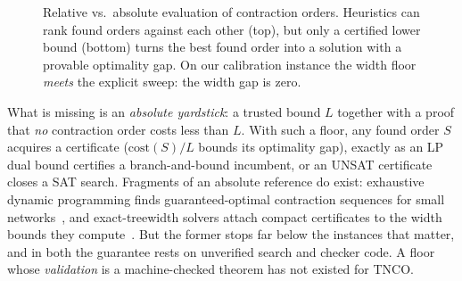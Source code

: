 \documentclass[sigplan,10pt,screen,review,anonymous]{acmart}
\begin{document}
\begin{figure}[t]
\centering
{}
\caption{Relative vs.\ absolute evaluation of contraction orders. Heuristics can rank found
orders against each other (top), but only a certified lower bound (bottom) turns the best
found order into a solution with a provable optimality gap. On our calibration instance the
width floor \emph{meets} the explicit sweep: the width gap is zero.}
\label{fig:yardstick}
\end{figure}

What is missing is an \emph{absolute yardstick}: a trusted bound $L$ together with a proof
that \emph{no} contraction order costs less than $L$. With such a floor, any found order $S$
acquires a certificate ($\mathrm{cost}(S)/L$ bounds its optimality gap), exactly as an
LP dual bound certifies a branch-and-bound incumbent, or an UNSAT certificate closes a SAT
search. Fragments of an absolute reference do exist: exhaustive dynamic programming finds
guaranteed-optimal contraction sequences for small networks~\cite{pfeifer2014faster}, and
exact-treewidth solvers attach compact certificates to the width bounds they
compute~\cite{tamaki2022heuristic}. But the former stops far below the instances that
matter, and in both the guarantee rests on unverified search and checker code. A floor whose
\emph{validation} is a machine-checked theorem has not existed for TNCO.
\end{document}
